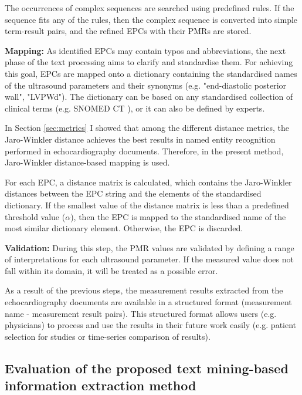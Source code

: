 The occurrences of complex sequences are searched using predefined rules. If the sequence fits any of the rules, then the complex sequence is converted into simple term-result pairs, and the refined EPCs with their PMRs are stored.

\textbf{Mapping:} As identified EPCs may contain typos and abbreviations, the next phase of the text processing aims to clarify and standardise them. For achieving this goal, EPCs are mapped onto a dictionary containing the standardised names of the ultrasound parameters and their synonyms (e.g. "end-diastolic posterior wall", "LVPWd"). The dictionary can be based on any standardised collection of clinical terms (e.g. SNOMED CT \cite{donnelly2006snomed}), or it can also be defined by experts.

In Section \ref{sec:metrics} I showed that among the different distance metrics, the Jaro-Winkler distance achieves the best results in named entity recognition performed in echocardiography documents. Therefore, in the present method, Jaro-Winkler distance-based mapping is used.

For each EPC, a distance matrix is calculated, which contains the Jaro-Winkler distances between the EPC string and the elements of the standardised dictionary. If the smallest value of the distance matrix is less than a predefined threshold value ($\alpha$), then the EPC is mapped to the standardised name of the most similar dictionary element. Otherwise, the EPC is discarded.

\textbf{Validation:} During this step, the PMR values are validated by defining a range of interpretations for each ultrasound parameter. If the measured value does not fall within its domain, it will be treated as a possible error.

As a result of the previous steps, the measurement results extracted from the echocardiography documents are available in a structured format (measurement name - measurement result pairs). This structured format allows users (e.g. physicians) to process and use the results in their future work easily (e.g. patient selection for studies or time-series comparison of results). 

\subsection{Evaluation of the proposed text mining-based information extraction method}
\label{sec:eval_text_mining}

